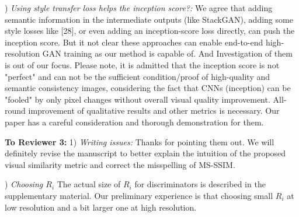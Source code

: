 \documentclass[10pt,twocolumn,letterpaper]{article}
\begin{document}
) \textit{Using style transfer loss helps the inception score?:} %
We agree that adding semantic information in the intermediate outputs (like StackGAN), adding some style losses like [28], or even adding an inception-score loss directly, can push the inception score. But it not clear these approaches can enable end-to-end high-resolution GAN training as our method is capable of. And Investigation of them is out of our focus. Please note, it is admitted that the inception score is not "perfect" and can not be the sufficient condition/proof of high-quality and semantic consistency images, considering the fact that CNNs (inception) can be "fooled" by only pixel changes without overall visual quality improvement. All-round improvement of qualitative results and other metrics is necessary. Our paper has a careful consideration and thorough demonstration for them.

\noindent
\textbf{To Reviewer 3:} 1) \textit{Writing issues:} Thanks for pointing them out. We will definitely revise the manuscript to better explain the intuition of the proposed visual similarity metric and correct the misspelling of MS-SSIM.

) \textit{Choosing $R_i$} The actual size of $R_i$ for discriminators is described in the supplementary material. Our preliminary experience is that choosing small $R_i$ at low resolution and a bit larger one at high resolution.








%		

%
%
%
\end{document}
